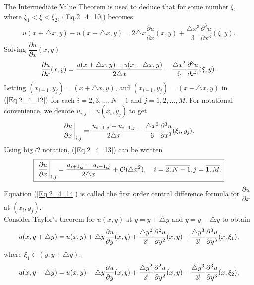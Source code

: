 The Intermediate Value Theorem is used to deduce that for some number $\xi$, where $\xi_{1} < \xi < \xi_{2}$, (\ref{Eq.2_4_10}) becomes
\begin{align*}%
u(x+\triangle x, y) - u(x-\triangle x, y) = 2 \triangle x \dfrac{\partial u}{\partial x}(x, y) +  \dfrac{\triangle x^{3}}{3} \dfrac{\partial^3 u}{\partial x^{3}} (\xi, y).
\end{align*}
Solving $\dfrac{\partial u}{\partial x}(x, y) $ 
\begin{align}{\label{Eq.2_4_12}}
\dfrac{\partial u}{\partial x}(x, y) = \dfrac{u(x+\triangle x, y) - u(x-\triangle x, y)}{2 \triangle x } - \dfrac{\triangle x^{2}}{6} \dfrac{\partial^3 u}{\partial x^{3}} (\xi, y).
\end{align}
Letting $(x_{i+1},y_{j})=(x+\triangle x,y)$, and $(x_{i-1},y_{j})=(x-\triangle x ,y )$  in $(\ref{Eq.2_4_12})$ for each $i = 2,3,\dots,N-1$ and $j=1,2,\dots,M$. For notational convenience, we denote $u_{i,j}= u(x_{i},y_{j})$ to get
\begin{align}{\label{Eq.2_4_13}}
\dfrac{\partial u}{\partial x}\bigg|_{i,j} = \dfrac{u_{i+1,j} - u_{i-1,j}}{2 \triangle x } - \dfrac{\triangle x^{2}}{6} \dfrac{\partial^3 u}{\partial x^{3}} (\xi_{i}, y_{j}).
\end{align}
Using big $\mathcal{O}$ notation, (\ref{Eq.2_4_13}) can be written
\begin{align}{\label{Eq.2_4_14}}
\fbox{ $ \displaystyle\dfrac{\partial u}{\partial x}\bigg|_{i,j} = \dfrac{u_{i+1,j} - u_{i-1,j}}{2 \triangle x } + \mathcal{O}(\triangle x^{2}),\quad i =\overline{2,N-1}, j=\overline{1,M}.$}
\end{align}
Equation (\ref{Eq.2_4_14}) is called the first order central difference formula for $\dfrac{\partial u}{\partial x }$ at $(x_{i}, y_{j})$.
\\
Consider Taylor's theorem for $u(x,y)$ at $y =  y + \triangle y $ and $y = y - \triangle y $ to obtain
\begin{align}{\label{Eq.2_4_15}}
u(x, y + \triangle y) = u(x,y) + \triangle y \dfrac{\partial u}{\partial y}(x, y) + \dfrac{\triangle y^{2}}{2!} \dfrac{\partial^2 u}{\partial y^{2}} (x, y) +  \dfrac{\triangle y^{3}}{3!} \dfrac{\partial^3 u}{\partial y^{3}} (x, \xi_{1}) ,
\end{align}
where $\xi_{1} \in (y, y + \triangle y)$.
\begin{align}{\label{Eq.2_4_16}}
u(x, y - \triangle y) = u(x,y) - \triangle y \dfrac{\partial u}{\partial y}(x, y) + \dfrac{\triangle y^{2}}{2!} \dfrac{\partial^2 u}{\partial y^{2}} (x, y) -  \dfrac{\triangle y^{3}}{3!} \dfrac{\partial^3 u}{\partial y^{3}} (x,\xi_{2}) ,
\end{align}
